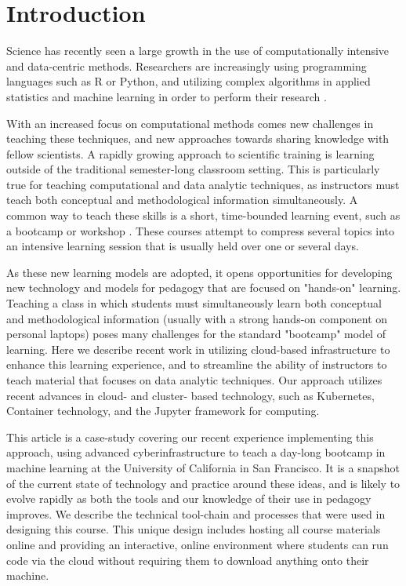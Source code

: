 \section{Introduction}

Science has recently seen a large growth in the use of
computationally intensive and data-centric methods. Researchers are
increasingly using programming languages such as R or Python, and utilizing
complex algorithms in applied statistics and machine learning in order to
perform their research \cite{momcheva2015astro}.

With an increased focus on computational methods
comes new challenges in teaching these techniques, and new approaches
towards sharing knowledge with fellow scientists.
A rapidly growing approach to scientific training is learning
outside of the traditional semester-long classroom setting.
This is particularly true
for teaching computational and data analytic techniques,
as instructors must teach both conceptual and methodological information
simultaneously. A common way to teach these skills is a short,
time-bounded learning event, such as a bootcamp or workshop
\cite{wilson2016software}. These  courses attempt to compress several
topics into an intensive learning session that is usually held over one or
several days.

As these new learning models are adopted, it opens
opportunities for developing new technology and models for pedagogy that are
focused on "hands-on" learning. Teaching a class in which students
must simultaneously learn both conceptual and methodological information
(usually with a strong hands-on component on personal laptops) poses
many challenges for the standard "bootcamp" model of
learning. Here we describe
recent work in utilizing cloud-based infrastructure to enhance this learning
experience, and to streamline the ability of instructors to
teach material that focuses on data analytic techniques. Our approach
utilizes recent advances in cloud- and cluster- based technology, such
as Kubernetes, Container technology, and the Jupyter framework for computing.

This article is a case-study covering our recent experience implementing this approach, using
advanced cyberinfrastructure to teach a day-long bootcamp in machine learning at
the University of California in San Francisco. It is a snapshot of the current state
of technology and practice around these ideas, and is likely to evolve rapidly
as both the tools and our knowledge of their use in pedagogy improves.
We describe the technical tool-chain and processes that were used in
designing this course. This
unique design includes hosting all course materials online and providing
an interactive, online environment where students can run code via the cloud
without requiring them to download anything onto their machine.

